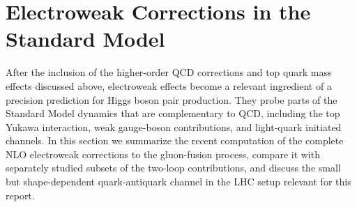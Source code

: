 \section{Electroweak Corrections in the Standard Model}
\label{sec:ew-sm}

After the inclusion of the higher-order QCD corrections and top quark mass effects discussed above, electroweak effects become a relevant ingredient of a precision prediction for Higgs boson pair production. They probe parts of the Standard Model dynamics that are complementary to QCD, including the top Yukawa interaction, weak gauge-boson contributions, and light-quark initiated channels. In this section we summarize the recent computation of the complete NLO electroweak corrections to the gluon-fusion process, compare it with separately studied subsets of the two-loop contributions, and discuss the small but shape-dependent quark-antiquark channel in the LHC setup relevant for this report.

%










